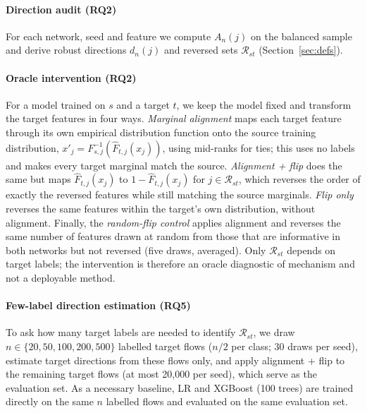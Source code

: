 \documentclass[preprint,12pt]{elsarticle}
\newcommand{\RQ}[1]{\textbf{RQ#1}}
\begin{document}
\paragraph{Direction audit (\RQ{2})}
For each network, seed and feature we compute $A_n(j)$ on the balanced sample and derive robust directions $d_n(j)$ and reversed sets $\mathcal{R}_{st}$ (Section~\ref{sec:defs}).

\paragraph{Oracle intervention (\RQ{2})}
For a model trained on $s$ and a target $t$, we keep the model fixed and transform the target features in four ways. \emph{Marginal alignment} maps each target feature through its own empirical distribution function onto the source training distribution, $x'_j = F^{-1}_{s,j}\!\left(\hat F_{t,j}(x_j)\right)$, using mid-ranks for ties; this uses no labels and makes every target marginal match the source. \emph{Alignment + flip} does the same but maps $\hat F_{t,j}(x_j)$ to $1-\hat F_{t,j}(x_j)$ for $j\in\mathcal{R}_{st}$, which reverses the order of exactly the reversed features while still matching the source marginals. \emph{Flip only} reverses the same features within the target's own distribution, without alignment. Finally, the \emph{random-flip control} applies alignment and reverses the same number of features drawn at random from those that are informative in both networks but not reversed (five draws, averaged). Only $\mathcal{R}_{st}$ depends on target labels; the intervention is therefore an oracle diagnostic of mechanism and not a deployable method.

\paragraph{Few-label direction estimation (\RQ{5})}
To ask how many target labels are needed to identify $\mathcal{R}_{st}$, we draw $n\in\{20,50,100,200,500\}$ labelled target flows ($n/2$ per class; 30 draws per seed), estimate target directions from these flows only, and apply alignment + flip to the remaining target flows (at most 20{,}000 per seed), which serve as the evaluation set. As a necessary baseline, LR and XGBoost (100 trees) are trained directly on the same $n$ labelled flows and evaluated on the same evaluation set.
\end{document}
